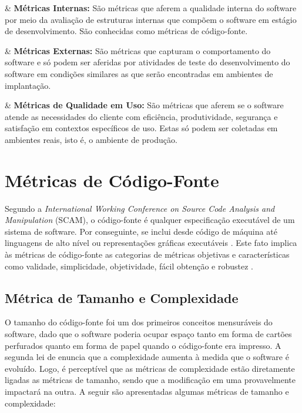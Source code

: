 \begin{easylist}[itemize]
	
		& \textbf{Métricas Internas:} 
		São métricas que aferem a qualidade interna do software por meio da 
		avaliação de estruturas internas que compõem o software em estágio de 
		desenvolvimento. São conhecidas como métricas de código-fonte.

		& \textbf{Métricas Externas:}
		São métricas que capturam o comportamento do software e só podem ser 
		aferidas por atividades de teste do desenvolvimento do software em condições similares as que serão encontradas em ambientes de
		implantação.

		& \textbf{Métricas de Qualidade em Uso:}
		São métricas que aferem se o software atende as necessidades do cliente
		com eficiência, produtividade, segurança e satisfação em contextos 
		específicos de uso. Estas só podem ser coletadas em ambientes reais, 
		isto é, o ambiente de produção.	
			 
\end{easylist}
		
				

\section {Métricas de Código-Fonte}
\label{sec:source-code}

Segundo a \textit{International Working Conference on Source Code Analysis and 
Manipulation} (SCAM), o código-fonte é qualquer especificação executável 
de um sistema de software. Por conseguinte, se inclui desde código de máquina 
até linguagens de alto nível ou representações gráficas executáveis \cite{harman2010source}. Este fato implica às métricas de código-fonte as categorias de métricas objetivas e características como validade, simplicidade, objetividade, fácil obtenção e robustez \cite{Mills:1999}. 


\subsection{Métrica de Tamanho e Complexidade}

\label{métricas tamanho e complexidade} 

O tamanho do código-fonte foi um dos primeiros conceitos mensuráveis do 
software, dado que o software poderia ocupar espaço tanto em forma de cartões 
perfurados quanto em forma de papel quando o código-fonte era impresso. 
A segunda lei de  enuncia que a complexidade aumenta à 
medida que o software é evoluído. Logo, é perceptível que as métricas de complexidade 
estão diretamente ligadas as métricas de tamanho, sendo que a modificação em 
uma provavelmente impactará na outra. A seguir são apresentadas 
algumas métricas de tamanho e complexidade:

